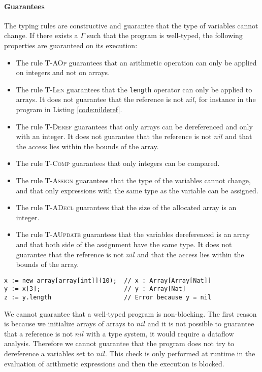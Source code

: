 \documentclass{article}
\begin{document}
\paragraph{Guarantees}
The typing rules are constructive and guarantee that the type of variables cannot change.
If there exists a \(\Gamma\) such that the program is well-typed, the following properties are guaranteed on its execution:
\begin{itemize}
 \item The rule \textsc{T-AOp} guarantees that an arithmetic operation can only be applied on integers and not on arrays.
 \item The rule \textsc{T-Len} guarantees that the \texttt{length} operator can only be applied to arrays. It does not guarantee that the reference is not \(nil\), for instance in the program in Listing \ref{code:nilderef}.
 \item The rule \textsc{T-Deref} guarantees that only arrays can be dereferenced and only with an integer. It does not guarantee that the reference is not \(nil\) and that the access lies within the bounds of the array.
 \item The rule \textsc{T-Comp} guarantees that only integers can be compared.
 \item The rule \textsc{T-Assign} guarantees that the type of the variables cannot change, and that only expressions with the same type as the variable can be assigned. 
 \item The rule \textsc{T-ADecl} guarantees that the size of the allocated array is an integer.
 \item The rule \textsc{T-AUpdate} guarantees that the variables dereferenced is an array and that both side of the assignment have the same type. It does not guarantee that the reference is not \(nil\) and that the access lies within the bounds of the array.
\end{itemize}

\begin{lstlisting}[caption=Example of program dereferencing a nil reference., label=code:nilderef]
x := new array[array[int]](10);  // x : Array[Array[Nat]]
y := x[3];                       // y : Array[Nat]
z := y.length                    // Error because y = nil

\end{lstlisting}

We cannot guarantee that a well-typed program is non-blocking.
The first reason is because we initialize arrays of arrays to \(nil\) and it is not possible to guarantee that a reference is not \(nil\) with a type system, it would require a dataflow analysis.
Therefore we cannot guarantee that the program does not try to dereference a variables set to \(nil\). This check is only performed at runtime in the evaluation of arithmetic expressions and then the execution is  blocked.
\end{document}
